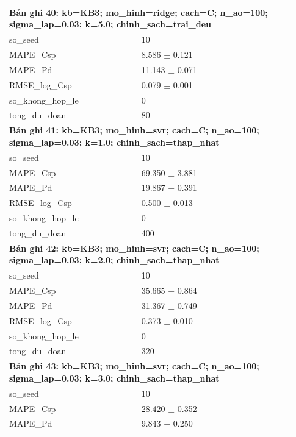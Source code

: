 \begin{longtable}{p{0.43\linewidth}p{0.50\linewidth}}
\midrule
\multicolumn{2}{p{0.95\linewidth}}{\textbf{Bản ghi 40: kb=KB3; mo\_hinh=ridge; cach=C; n\_ao=100; sigma\_lap=0.03; k=5.0; chinh\_sach=trai\_deu}} \\
so\_\allowbreak seed & 10 \\
MAPE\_\allowbreak Csp & 8.586 $\pm$ 0.121 \\
MAPE\_\allowbreak Pd & 11.143 $\pm$ 0.071 \\
RMSE\_\allowbreak log\_\allowbreak Csp & 0.079 $\pm$ 0.001 \\
so\_\allowbreak khong\_\allowbreak hop\_\allowbreak le & 0 \\
tong\_\allowbreak du\_\allowbreak doan & 80 \\
\midrule
\multicolumn{2}{p{0.95\linewidth}}{\textbf{Bản ghi 41: kb=KB3; mo\_hinh=svr; cach=C; n\_ao=100; sigma\_lap=0.03; k=1.0; chinh\_sach=thap\_nhat}} \\
so\_\allowbreak seed & 10 \\
MAPE\_\allowbreak Csp & 69.350 $\pm$ 3.881 \\
MAPE\_\allowbreak Pd & 19.867 $\pm$ 0.391 \\
RMSE\_\allowbreak log\_\allowbreak Csp & 0.500 $\pm$ 0.013 \\
so\_\allowbreak khong\_\allowbreak hop\_\allowbreak le & 0 \\
tong\_\allowbreak du\_\allowbreak doan & 400 \\
\midrule
\multicolumn{2}{p{0.95\linewidth}}{\textbf{Bản ghi 42: kb=KB3; mo\_hinh=svr; cach=C; n\_ao=100; sigma\_lap=0.03; k=2.0; chinh\_sach=thap\_nhat}} \\
so\_\allowbreak seed & 10 \\
MAPE\_\allowbreak Csp & 35.665 $\pm$ 0.864 \\
MAPE\_\allowbreak Pd & 31.367 $\pm$ 0.749 \\
RMSE\_\allowbreak log\_\allowbreak Csp & 0.373 $\pm$ 0.010 \\
so\_\allowbreak khong\_\allowbreak hop\_\allowbreak le & 0 \\
tong\_\allowbreak du\_\allowbreak doan & 320 \\
\midrule
\multicolumn{2}{p{0.95\linewidth}}{\textbf{Bản ghi 43: kb=KB3; mo\_hinh=svr; cach=C; n\_ao=100; sigma\_lap=0.03; k=3.0; chinh\_sach=thap\_nhat}} \\
so\_\allowbreak seed & 10 \\
MAPE\_\allowbreak Csp & 28.420 $\pm$ 0.352 \\
MAPE\_\allowbreak Pd & 9.843 $\pm$ 0.250 \\

\end{longtable}
